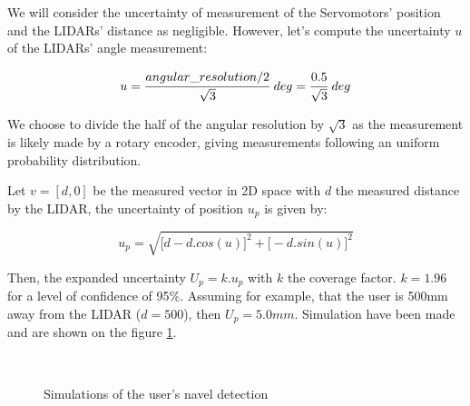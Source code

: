 \documentclass{article}
\newcommand{\vsp}{\vspace{\baselineskip}}
\begin{document}
We will consider the uncertainty of measurement of the Servomotors' position and the LIDARs' distance as negligible. However, let's compute the uncertainty $u$ of the LIDARs' angle measurement:

\begin{equation}
    u = \cfrac{angular\_resolution/2}{\sqrt{3}}\ deg = \cfrac{0.5}{\sqrt{3}}\ deg
\end{equation}

We choose to divide the half of the angular resolution by $\sqrt{3}$ as the measurement is likely made by a rotary encoder, giving measurements following an uniform probability distribution.

\vsp

Let $v=[d,0]$ be the measured vector in 2D space with $d$ the measured distance by the LIDAR, the uncertainty of position $u_p$ is given by:

\begin{equation}
        u_p = \sqrt{\big[ d - d.cos(u) \big] ^2 + \big[ -d.sin(u) \big] ^2}
\end{equation}

Then, the expanded uncertainty $U_p = k.u_p$ with $k$ the coverage factor. $k=1.96$ for a level of confidence of 95\%. Assuming for example, that the user is 500mm away from the LIDAR ($d=500$), then $U_p=5.0mm$. Simulation have been made and are shown on the figure \ref{fig:sim_navel_detection}. 

\begin{figure}[H]
    \centering
        \\
    \caption{Simulations of the user's navel detection}
    \label{fig:sim_navel_detection}
\end{figure}
\end{document}
